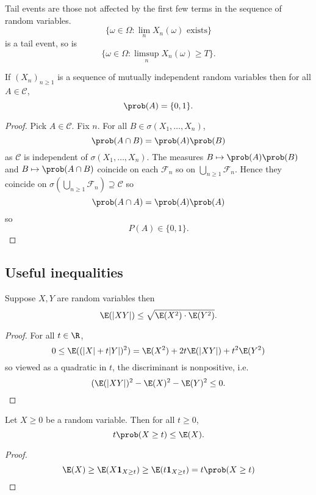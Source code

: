 \documentclass[a4paper]{article}
\renewcommand{\P}{\prob} %
\begin{document}
\begin{eg}
  Tail events are those not affected by the first few terms in the sequence of random variables.
  \[
    \{\omega \in \Omega: \lim_n X_n(\omega) \text{ exists}\}
  \]
  is a tail event, so is
  \[
    \{\omega \in \Omega: \limsup_n X_n(\omega) \geq T\}.
  \]
\end{eg}

\begin{theorem}
  If \((X_n)_{n \geq 1}\) is a sequence of mutually independent random variables then for all \(A \in \mathcal C\),
  \[
    \P(A) = \{0, 1\}.
  \]
\end{theorem}

\begin{proof}
  Pick \(A \in \mathcal C\). Fix \(n\). For all \(B \in \sigma(X_1, \dots, X_n)\),
  \[
    \P(A \cap B) = \P(A) \P(B)
  \]
  as \(\mathcal C\) is independent of \(\sigma(X_1, \dots, X_n)\). The measures \(B \mapsto \P(A) \P(B)\) and \(B \mapsto \P(A \cap B)\) coincide on each \(\mathcal F_n\) so on \(\bigcup_{n \geq 1} \mathcal F_n\). Hence they coincide on \(\sigma(\bigcup_{n \geq 1} \mathcal F_n) \supseteq \mathcal C\) so
  \[
    \P(A \cap A) = \P(A) \P(A)
  \]
  so
  \[
    P(A) \in \{0, 1\}.
  \]
\end{proof}

\subsection{Useful inequalities}

\begin{proposition}
  Suppose \(X, Y\) are random variables then
  \[
    \E(|XY|) \leq \sqrt{\E(X^2) \cdot \E(Y^2)}.
  \]
\end{proposition}

\begin{proof}
  For all \(t \in \R\),
  \[
    0 \leq \E((|X| + t|Y|)^2) = \E(X^2) + 2t \E(|XY|) + t^2\E(Y^2)
  \]
  so viewed as a quadratic in \(t\), the discriminant is nonpositive, i.e.
  \[
    (\E(|XY|)^2 - \E(X)^2 - \E(Y)^2 \leq 0.
  \]
\end{proof}

\begin{proposition}[Markov]
  Let \(X \geq 0\) be a random variable. Then for all \(t \geq 0\),
  \[
    t \P(X \geq t) \leq \E(X).
  \]
\end{proposition}

\begin{proof}
  \[
    \E(X)
    \geq \E(X \mathbf 1_{X \geq t})
    \geq \E(t \mathbf 1_{X \geq t})
    = t \P(X \geq t)
  \]
\end{proof}
\end{document}
